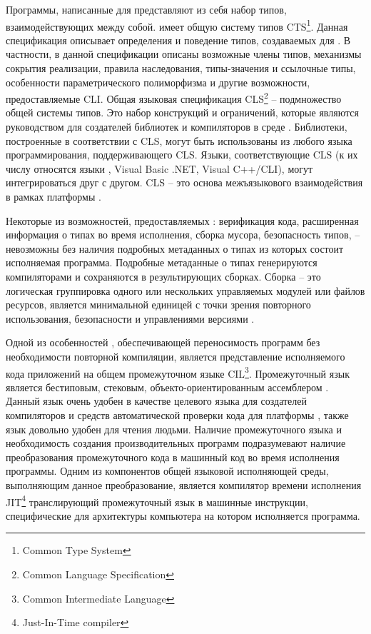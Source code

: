 Программы, написанные для \DotNet представляют из себя набор типов, взаимодействующих между собой. \DotNet имеет общую систему типов CTS\footnote{Common Type System}. Данная спецификация описывает определения и поведение типов, создаваемых для \DotNet \cite{Richter}. В частности, в данной спецификации описаны возможные члены типов, механизмы сокрытия реализации, правила наследования, типы-значения и ссылочные типы, особенности параметрического полиморфизма и другие возможности, предоставляемые CLI. Общая языковая спецификация CLS\footnote{Common Language Specification} -- подмножество общей системы типов. Это набор конструкций и ограничений, которые являются руководством для создателей библиотек и компиляторов в среде \DotNet. Библиотеки, построенные в соответствии с CLS, могут быть использованы из любого языка программирования, поддерживающего CLS. Языки, соответствующие CLS (к их числу относятся языки \CSharp, Visual Basic .NET, Visual C++/CLI), могут интегрироваться друг с другом. CLS -- это основа межъязыкового взаимодействия в рамках платформы \DotNet \cite{Marchenko}.

Некоторые из возможностей, предоставляемых \DotNet: верификация кода, расширенная информация о типах во время исполнения, сборка мусора, безопасность типов, -- невозможны без наличия подробных метаданных о типах из которых состоит исполняемая программа. Подробные метаданные о типах генерируются компиляторами и сохраняются в результирующих сборках. Сборка -- это логическая группировка одного или нескольких управляемых модулей или файлов ресурсов, является минимальной единицей с точки зрения повторного использования, безопасности и управлениями версиями \cite{Richter}.

Одной из особенностей \DotNet, обеспечивающей переносимость программ без необходимости повторной компиляции, является представление исполняемого кода приложений на общем промежуточном языке CIL\footnote{Common Intermediate Language}. Промежуточный язык является бестиповым, стековым, объекто-ориентированным ассемблером \cite{Richter}. Данный язык очень удобен в качестве целевого языка для создателей компиляторов и средств автоматической проверки кода для платформы \DotNet, также язык довольно удобен для чтения людьми. Наличие промежуточного языка и необходимость создания производительных программ подразумевают наличие преобразования промежуточного кода в машинный код во время исполнения программы. Одним из компонентов общей языковой исполняющей среды, выполняющим данное преобразование, является компилятор времени исполнения JIT\footnote{Just-In-Time compiler} транслирующий промежуточный язык в машинные инструкции, специфические для архитектуры компьютера на котором исполняется программа.

